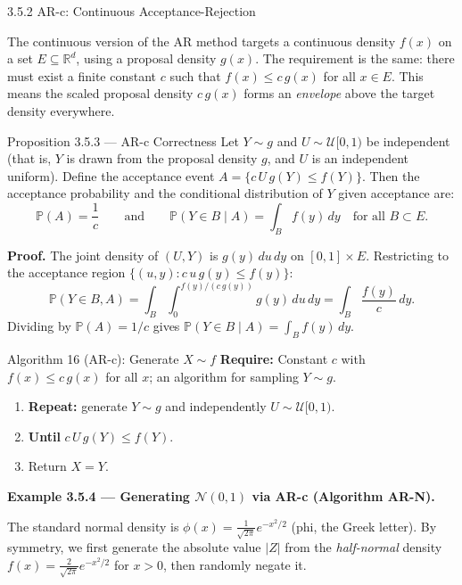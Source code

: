 \documentclass[aspectratio=169,10pt]{beamer}
\newcommand{\PP}{\mathbb{P}}
\newcommand{\RR}{\mathbb{R}}
\newcommand{\UU}{\mathcal{U}}
\newcommand{\NN}{\mathcal{N}}
\begin{document}
\begin{frame}[allowframebreaks]{3.5.2 AR-c: Continuous Acceptance-Rejection}

The continuous version of the AR method targets a continuous density $f(x)$
on a set $E \subseteq \RR^d$, using a proposal density $g(x)$.  The requirement
is the same: there must exist a finite constant $c$ such that $f(x) \le c \, g(x)$
for all $x \in E$.  This means the scaled proposal density $c \, g(x)$ forms an
\emph{envelope} above the target density everywhere.

\begin{block}{Proposition 3.5.3 --- AR-c Correctness}
  Let $Y \sim g$ and $U \sim \UU[0,1)$ be independent (that is, $Y$ is drawn
  from the proposal density $g$, and $U$ is an independent uniform).
  Define the acceptance event $A = \{c \, U \, g(Y) \le f(Y)\}$.
  Then the acceptance probability and the conditional distribution of $Y$ given
  acceptance are:
  \[
    \PP(A) = \frac{1}{c} \qquad \text{and} \qquad
    \PP(Y \in B \mid A) = \int_B f(y)\,dy \quad \text{for all } B \subset E.
  \]
\end{block}

\textbf{Proof.}  The joint density of $(U, Y)$ is $g(y)\,du\,dy$ on $[0,1] \times E$.
Restricting to the acceptance region $\{(u,y) : c \, u \, g(y) \le f(y)\}$:
\[
  \PP(Y \in B, A)
  = \int_B \int_0^{f(y)/(c\,g(y))} g(y)\,du\,dy
  = \int_B \frac{f(y)}{c}\,dy.
\]
Dividing by $\PP(A) = 1/c$ gives $\PP(Y \in B \mid A) = \int_B f(y)\,dy$.

\begin{alertblock}{Algorithm 16 (AR-c): Generate $X \sim f$}
  \textbf{Require:} Constant $c$ with $f(x) \le c \, g(x)$ for all $x$;
  an algorithm for sampling $Y \sim g$.
  \begin{enumerate}
    \item \textbf{Repeat:} generate $Y \sim g$ and independently $U \sim \UU[0,1)$.
    \item \textbf{Until} $c \, U \, g(Y) \le f(Y)$.
    \item Return $X = Y$.
  \end{enumerate}
\end{alertblock}

\framebreak

\textbf{Example 3.5.4 --- Generating $\NN(0,1)$ via AR-c (Algorithm AR-N).}

The standard normal density is $\phi(x) = \frac{1}{\sqrt{2\pi}} e^{-x^2/2}$
(phi, the Greek letter).  By symmetry, we first generate the absolute value
$|Z|$ from the \emph{half-normal} density
$f(x) = \frac{2}{\sqrt{2\pi}} e^{-x^2/2}$ for $x > 0$, then randomly negate it.


\end{frame}
\end{document}
